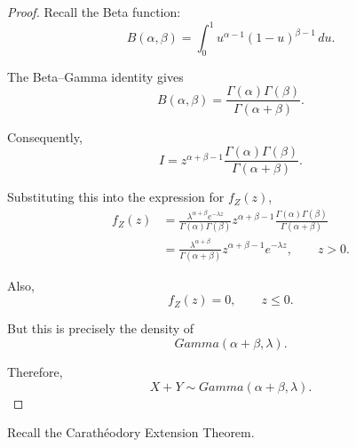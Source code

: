 \begin{proof}
Recall the Beta function:
\[
B(\alpha,\beta)
=
\int_0^1
u^{\alpha-1}(1-u)^{\beta-1}\,du.
\]

The Beta--Gamma identity gives
\[
B(\alpha,\beta)
=
\frac{\Gamma(\alpha)\Gamma(\beta)}
{\Gamma(\alpha+\beta)}.
\]

Consequently,
\[
I
=
z^{\alpha+\beta-1}
\frac{\Gamma(\alpha)\Gamma(\beta)}
{\Gamma(\alpha+\beta)}.
\]

Substituting this into the expression for $f_Z(z)$,
\[
\begin{aligned}
f_Z(z)
&=
\frac{\lambda^{\alpha+\beta}e^{-\lambda z}}
{\Gamma(\alpha)\Gamma(\beta)}
z^{\alpha+\beta-1}
\frac{\Gamma(\alpha)\Gamma(\beta)}
{\Gamma(\alpha+\beta)}\\
&=
\frac{\lambda^{\alpha+\beta}}
{\Gamma(\alpha+\beta)}
z^{\alpha+\beta-1}e^{-\lambda z},
\qquad z>0.
\end{aligned}
\]

Also,
\[
f_Z(z)=0,
\qquad z\leq0.
\]

But this is precisely the density of
\[
Gamma(\alpha+\beta,\lambda).
\]

Therefore,
\[
\boxed{
X+Y\sim Gamma(\alpha+\beta,\lambda).
}
\]

\end{proof}





Recall the Carathéodory Extension Theorem.




\lectureend

